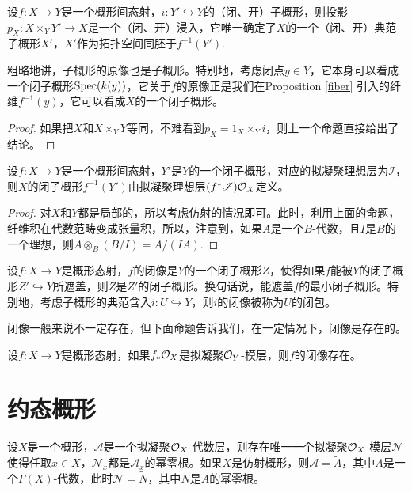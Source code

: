 \begin{pro}[子概形的原像]
设$f:X\to Y$是一个概形间态射，$i:Y'\hookrightarrow Y$的（闭、开）子概形，则投影$p_X:X\times_Y Y'\to X$是一个（闭、开）浸入，它唯一确定了$X$的一个（闭、开）典范子概形$X'$，$X'$作为拓扑空间同胚于$f^{-1}(Y')$.
\end{pro}

粗略地讲，子概形的原像也是子概形。特别地，考虑闭点$y\in Y$，它本身可以看成一个闭子概形$\operatorname{Spec} (k(y))$，它关于$f$的原像正是我们在Proposition \ref{fiber} 引入的纤维$f^{-1}(y)$，它可以看成$X$的一个闭子概形。

\begin{proof}
如果把$X$和$X\times_Y Y$等同，不难看到$p_X=1_X\times_Y i$，则上一个命题直接给出了结论。
\end{proof}

\begin{pro}
	设$f:X\to Y$是一个概形间态射，$Y'$是$Y$的一个闭子概形，对应的拟凝聚理想层为$\mathscr I$，则$X$的闭子概形$f^{-1}(Y')$由拟凝聚理想层$(f^*\mathscr I)\mathcal{O}_X$定义。
\end{pro}

\begin{proof}
	对$X$和$Y$都是局部的，所以考虑仿射的情况即可。此时，利用上面的命题，纤维积在代数范畴变成张量积，所以，注意到，如果$A$是一个$B$-代数，且$I$是$B$的一个理想，则$A\otimes_B (B/I)=A/(IA)$.
\end{proof}

\begin{para}[闭像与闭包]
	设$f:X\to Y$是概形态射，$f$的闭像是$Y$的一个闭子概形$Z$，使得如果$f$能被$Y$的闭子概形$Z'\hookrightarrow Y$所遮盖，则$Z$是$Z'$的闭子概形。换句话说，能遮盖$f$的最小闭子概形。特别地，考虑子概形的典范含入$i:U\hookrightarrow Y$，则$i$的闭像被称为$U$的闭包。
\end{para}

闭像一般来说不一定存在，但下面命题告诉我们，在一定情况下，闭像是存在的。

\begin{pro}
	设$f:X\to Y$是概形态射，如果$f_*\mathcal{O}_X$是拟凝聚$\mathcal{O}_Y$-模层，则$f$的闭像存在。
\end{pro}

\section{约态概形}

\begin{pro}
	设$X$是一个概形，$\mathcal A$是一个拟凝聚$\mathcal{O}_X$-代数层，则存在唯一一个拟凝聚$\mathcal{O}_X$-模层$\mathcal N$使得任取$x\in X$，$\mathcal N_x$都是$\mathcal A_x$的幂零根。如果$X$是仿射概形，则$\mathcal A=\widetilde{A}$，其中$A$是一个$\Gamma(X)$-代数，此时$\mathcal N=\widetilde{N}$，其中$N$是$A$的幂零根。
\end{pro}

